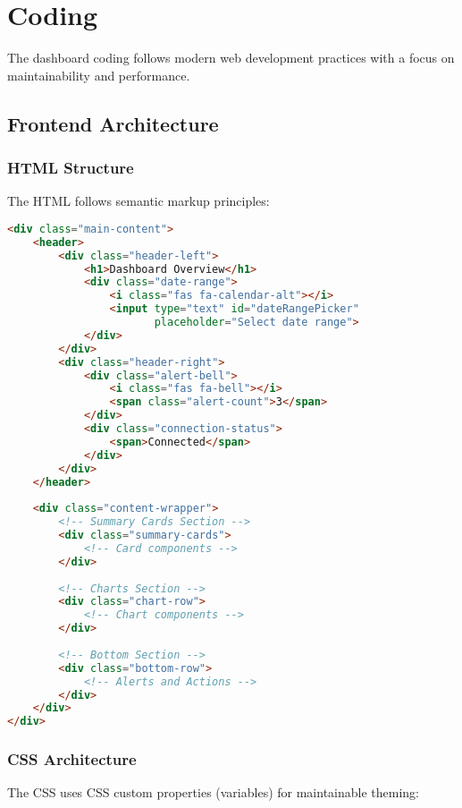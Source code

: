 \documentclass[12pt,a4paper]{report}
\begin{document}
\section{Coding}

The dashboard coding follows modern web development practices with a focus on maintainability and performance.

\subsection{Frontend Architecture}

\subsubsection{HTML Structure}
The HTML follows semantic markup principles:

\begin{lstlisting}[language=HTML, caption=Main Content Structure]
<div class="main-content">
    <header>
        <div class="header-left">
            <h1>Dashboard Overview</h1>
            <div class="date-range">
                <i class="fas fa-calendar-alt"></i>
                <input type="text" id="dateRangePicker" 
                       placeholder="Select date range">
            </div>
        </div>
        <div class="header-right">
            <div class="alert-bell">
                <i class="fas fa-bell"></i>
                <span class="alert-count">3</span>
            </div>
            <div class="connection-status">
                <span>Connected</span>
            </div>
        </div>
    </header>
    
    <div class="content-wrapper">
        <!-- Summary Cards Section -->
        <div class="summary-cards">
            <!-- Card components -->
        </div>
        
        <!-- Charts Section -->
        <div class="chart-row">
            <!-- Chart components -->
        </div>
        
        <!-- Bottom Section -->
        <div class="bottom-row">
            <!-- Alerts and Actions -->
        </div>
    </div>
</div>
\end{lstlisting}

\subsubsection{CSS Architecture}
The CSS uses CSS custom properties (variables) for maintainable theming:
\end{document}

